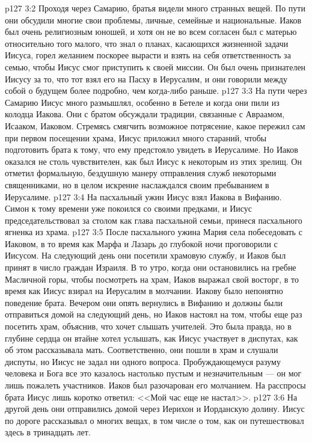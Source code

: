 \vs p127 3:2 Проходя через Самарию, братья видели много странных вещей. По пути они обсудили многие свои проблемы, личные, семейные и национальные. Иаков был очень религиозным юношей, и хотя он не во всем согласен был с матерью относительно того малого, что знал о планах, касающихся жизненной задачи Иисуса, горел желанием поскорее вырасти и взять на себя ответственность за семью, чтобы Иисус смог приступить к своей миссии. Он был очень признателен Иисусу за то, что тот взял его на Пасху в Иерусалим, и они говорили между собой о будущем более подробно, чем когда\hyp{}либо раньше.
\vs p127 3:3 На пути через Самарию Иисус много размышлял, особенно в Бетеле и когда они пили из колодца Иакова. Они с братом обсуждали традиции, связанные с Авраамом, Исааком, Иаковом. Стремясь смягчить возможное потрясение, какое пережил сам при первом посещении храма, Иисус приложил много стараний, чтобы подготовить брата к тому, что ему предстояло увидеть в Иерусалиме. Но Иаков оказался не столь чувствителен, как был Иисус к некоторым из этих зрелищ. Он отметил формальную, бездушную манеру отправления служб некоторыми священниками, но в целом искренне наслаждался своим пребыванием в Иерусалиме.
\vs p127 3:4 На пасхальный ужин Иисус взял Иакова в Вифанию. Симон к тому времени уже покоился со своими предками, и Иисус председательствовал за столом как глава пасхальной семьи, принеся пасхального ягненка из храма.
\vs p127 3:5 После пасхального ужина Мария села побеседовать с Иаковом, в то время как Марфа и Лазарь до глубокой ночи проговорили с Иисусом. На следующий день они посетили храмовую службу, и Иаков был принят в число граждан Израиля. В то утро, когда они остановились на гребне Масличной горы, чтобы посмотреть на храм, Иаков выражал свой восторг, в то время как Иисус взирал на Иерусалим в молчании. Иакову было непонятно поведение брата. Вечером они опять вернулись в Вифанию и должны были отправиться домой на следующий день, но Иаков настоял на том, чтобы еще раз посетить храм, объяснив, что хочет слышать учителей. Это была правда, но в глубине сердца он втайне хотел услышать, как Иисус участвует в диспутах, как об этом рассказывала мать. Соответственно, они пошли в храм и слушали диспуты, но Иисус не задал ни одного вопроса. Пробуждающемуся разуму человека и Бога все это казалось настолько пустым и незначительным --- он мог лишь пожалеть участников. Иаков был разочарован его молчанием. На расспросы брата Иисус лишь коротко ответил: <<Мой час еще не настал>>.
\vs p127 3:6 На другой день они отправились домой через Иерихон и Иорданскую долину. Иисус по дороге рассказывал о многих вещах, в том числе о том, как он путешествовал здесь в тринадцать лет.

